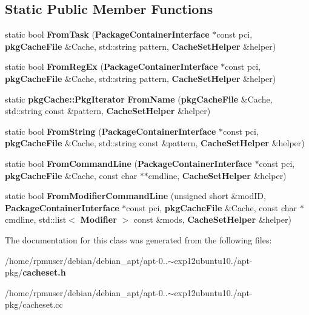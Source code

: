 \subsection*{\-Static \-Public \-Member \-Functions}
\begin{DoxyCompactItemize}
\item 
static bool {\bfseries \-From\-Task} ({\bf \-Package\-Container\-Interface} $\ast$const pci, {\bf pkg\-Cache\-File} \&\-Cache, std\-::string pattern, {\bf \-Cache\-Set\-Helper} \&helper)\label{classAPT_1_1PackageContainerInterface_a16cb5b96236de4a8ab72d1a6aabd1b08}

\item 
static bool {\bfseries \-From\-Reg\-Ex} ({\bf \-Package\-Container\-Interface} $\ast$const pci, {\bf pkg\-Cache\-File} \&\-Cache, std\-::string pattern, {\bf \-Cache\-Set\-Helper} \&helper)\label{classAPT_1_1PackageContainerInterface_aaefa144c45b4268979140612d5259a2b}

\item 
static {\bf pkg\-Cache\-::\-Pkg\-Iterator} {\bfseries \-From\-Name} ({\bf pkg\-Cache\-File} \&\-Cache, std\-::string const \&pattern, {\bf \-Cache\-Set\-Helper} \&helper)\label{classAPT_1_1PackageContainerInterface_a1c485e0fdaa90c1f089ef5d97668df4d}

\item 
static bool {\bfseries \-From\-String} ({\bf \-Package\-Container\-Interface} $\ast$const pci, {\bf pkg\-Cache\-File} \&\-Cache, std\-::string const \&pattern, {\bf \-Cache\-Set\-Helper} \&helper)\label{classAPT_1_1PackageContainerInterface_ae690083263e27b78a034a30855a1dbf9}

\item 
static bool {\bfseries \-From\-Command\-Line} ({\bf \-Package\-Container\-Interface} $\ast$const pci, {\bf pkg\-Cache\-File} \&\-Cache, const char $\ast$$\ast$cmdline, {\bf \-Cache\-Set\-Helper} \&helper)\label{classAPT_1_1PackageContainerInterface_a67672d23a14e49d59153c10bcd15c972}

\item 
static bool {\bfseries \-From\-Modifier\-Command\-Line} (unsigned short \&mod\-I\-D, {\bf \-Package\-Container\-Interface} $\ast$const pci, {\bf pkg\-Cache\-File} \&\-Cache, const char $\ast$cmdline, std\-::list$<$ {\bf \-Modifier} $>$ const \&mods, {\bf \-Cache\-Set\-Helper} \&helper)\label{classAPT_1_1PackageContainerInterface_a50268bdc6ac7b73ef0a253353c9c1fcb}

\end{DoxyCompactItemize}


\-The documentation for this class was generated from the following files\-:\begin{DoxyCompactItemize}
\item 
/home/rpmuser/debian/debian\-\_\-apt/apt-\/0..$\sim$exp12ubuntu10./apt-\/pkg/{\bf cacheset.\-h}\item 
/home/rpmuser/debian/debian\-\_\-apt/apt-\/0..$\sim$exp12ubuntu10./apt-\/pkg/cacheset.\-cc\end{DoxyCompactItemize}
